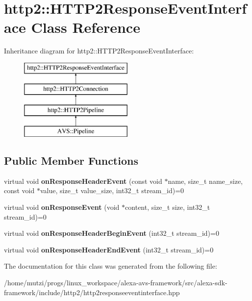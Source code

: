 \hypertarget{classhttp2_1_1HTTP2ResponseEventInterface}{}\section{http2\+:\+:H\+T\+T\+P2\+Response\+Event\+Interface Class Reference}
\label{classhttp2_1_1HTTP2ResponseEventInterface}
Inheritance diagram for http2\+:\+:H\+T\+T\+P2\+Response\+Event\+Interface\+:\begin{figure}[H]
\begin{center}
\leavevmode
\includegraphics[height=4.000000cm]{d4/dcf/classhttp2_1_1HTTP2ResponseEventInterface}
\end{center}
\end{figure}
\subsection*{Public Member Functions}
\begin{DoxyCompactItemize}
\item 
\mbox{\label{classhttp2_1_1HTTP2ResponseEventInterface_afd74d4a354532ead83d4716a0d9ee630}} 
virtual void {\bfseries on\+Response\+Header\+Event} (const void $\ast$name, size\+\_\+t name\+\_\+size, const void $\ast$value, size\+\_\+t value\+\_\+size, int32\+\_\+t stream\+\_\+id)=0
\item 
\mbox{\label{classhttp2_1_1HTTP2ResponseEventInterface_ab388c8800f6bec269b28e2e9a2bf8384}} 
virtual void {\bfseries on\+Response\+Event} (void $\ast$content, size\+\_\+t size, int32\+\_\+t stream\+\_\+id)=0
\item 
\mbox{\label{classhttp2_1_1HTTP2ResponseEventInterface_a43e1f8d69c0862cd76cc5a25b51d1fa6}} 
virtual void {\bfseries on\+Response\+Header\+Begin\+Event} (int32\+\_\+t stream\+\_\+id)=0
\item 
\mbox{\label{classhttp2_1_1HTTP2ResponseEventInterface_a3477e8b084d413fb03c6134398afa539}} 
virtual void {\bfseries on\+Response\+Header\+End\+Event} (int32\+\_\+t stream\+\_\+id)=0
\end{DoxyCompactItemize}


The documentation for this class was generated from the following file\+:\begin{DoxyCompactItemize}
\item 
/home/mutzi/progs/linux\+\_\+workspace/alexa-\/avs-\/framework/src/alexa-\/sdk-\/framework/include/http2/http2responseeventinterface.\+hpp\end{DoxyCompactItemize}
